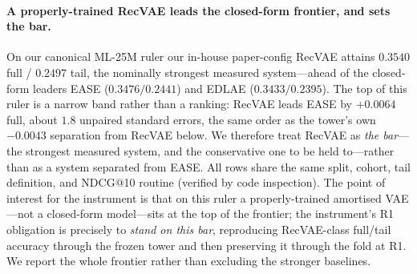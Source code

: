 \documentclass[11pt]{article}
\begin{document}
\paragraph{A properly-trained RecVAE leads the closed-form frontier, and sets the bar.} On our canonical ML-25M
ruler our in-house paper-config RecVAE attains $0.3540$ full / $0.2497$ tail, the nominally strongest measured
system---ahead of the closed-form leaders EASE ($0.3476/0.2441$) and EDLAE ($0.3433/0.2395$). The top of this ruler
is a narrow band rather than a ranking: RecVAE leads EASE by $+0.0064$ full, about $1.8$ unpaired standard errors,
the same order as the tower's own $-0.0043$ separation from RecVAE below. We therefore
treat RecVAE as \emph{the bar}---the strongest measured system, and the conservative one to be held to---rather than
as a system separated from EASE. All rows share the same split, cohort, tail definition,
and NDCG@10 routine (verified by code inspection). The point of interest for the instrument is that on this ruler a
properly-trained amortised VAE---not a closed-form model---sits at the top of the frontier; the instrument's R1
obligation is precisely to \emph{stand on this bar}, reproducing RecVAE-class full/tail accuracy through the frozen
tower and then preserving it through the fold at R1. We report the whole frontier rather than excluding the stronger
baselines.
\end{document}
